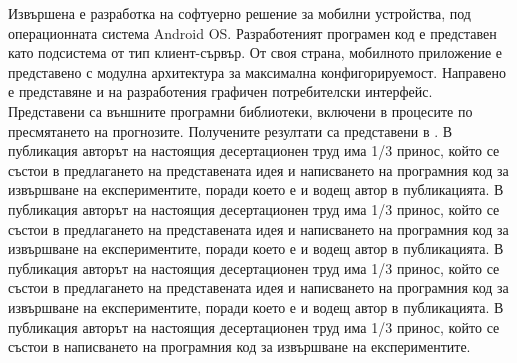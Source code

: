 Извършена е разработка на софтуерно решение за мобилни устройства, под операционната система Android OS. Разработеният програмен код е представен като подсистема от тип клиент-сървър. От своя страна, мобилното приложение е представено с модулна архитектура за максимална конфигорируемост. Направено е представяне и на разработения графичен потребителски интерфейс. Представени са външните програмни библиотеки, включени в процесите по пресмятането на прогнозите. Получените резултати са представени в \cite{Tomov-05, Tomov-06, Tomov-07, Zankinski-02}. В публикация \cite{Tomov-05} авторът на настоящия десертационен труд има 1/3 принос, който се състои в предлагането на представената идея и написването на програмния код за извършване на експериментите, поради което е и водещ автор в публикацията. В публикация \cite{Tomov-06} авторът на настоящия десертационен труд има 1/3 принос, който се състои в предлагането на представената идея и написването на програмния код за извършване на експериментите, поради което е и водещ автор в публикацията. В публикация \cite{Tomov-07} авторът на настоящия десертационен труд има 1/3 принос, който се състои в предлагането на представената идея и написването на програмния код за извършване на експериментите, поради което е и водещ автор в публикацията. В публикация \cite{Zankinski-02} авторът на настоящия десертационен труд има 1/3 принос, който се състои в написването на програмния код за извършване на експериментите.

